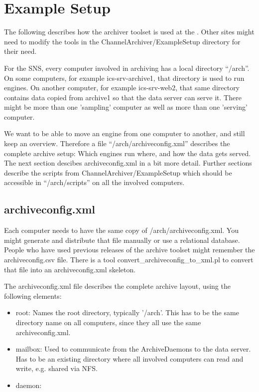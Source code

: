 \chapter{Example Setup} \label{ch:examplesetup}
The following describes how the archiver toolset is used at the
. Other sites might need to
modify the tools in the ChannelArchiver/ExampleSetup directory for their
need.

For the SNS, every computer involved in archiving has a local directory ``/arch''.
On some computers, for example ics-srv-archive1, that directory
is used to run engines.
On another computer, for example ics-srv-web2, that same directory
contains data copied from archive1 so that the data server
can serve it.
There might be more than one 'sampling' computer as well as more
than one 'serving' computer.

We want to be able to move an engine from one computer to another,
and still keep an overview.
Therefore a file ``/arch/archiveconfig.xml'' describes the complete
archive setup: Which engines run where, and how the data gets served.
The next section descibes archiveconfig.xml in a bit more detail.
Further sections describe the scripts from ChannelArchiver/ExampleSetup
which should be accessible in ``/arch/scripts'' on all the involved computers.

\section{archiveconfig.xml}


Each computer needs to have the same copy of /arch/archiveconfig.xml.
You might generate and distribute that file manually
or use a relational database.
People who have used previous releases of the archive toolset might
remember the archiveconfig.csv file. There is a tool
convert\_archiveconfig\_to\_xml.pl to convert that file
into an archiveconfig.xml skeleton.

\clearpage

The archiveconfig.xml file describes the complete archive layout,
using the following elements:
\begin{itemize}
\item root: Names the root directory, typically '/arch'.
      This has to be the same directory name on all computers,
      since they all use the same archiveconfig.xml.
\item mailbox: Used to communicate from the ArchiveDaemons to
      the data server. Has to be an existing directory where
      all involved computers can read and write, e.g.
      shared via NFS.
\item daemon:
\end{itemize}

